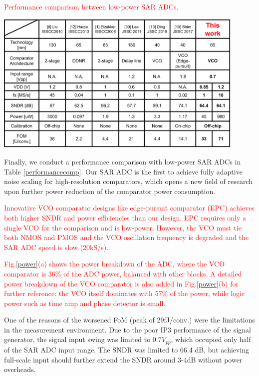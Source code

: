 \documentclass[journal]{IEEEtran}
\begin{document}
\begin{table}[!]
\centering
 \caption{\textcolor{red}{Performance comparison between low-power SAR ADCs.}}
 \includegraphics[width=0.9\textwidth]{figs/table.png}
  \label{performancecomp}
\end{table}

Finally, we conduct a performance comparison with low-power SAR ADCs in Table \ref{performancecomp}. Our SAR ADC is the first to achieve fully adaptive noise scaling for high-resolution comparators, which opens a new field of research upon further power reduction of the comparator power consumption. 

\textcolor{red}{Innovative VCO comparator designs like edge-pursuit comparator (EPC) \cite{shim2017edge} achieves both higher SNDR and power efficiencies than our design. EPC requires only a single VCO for the comparison and is low-power. However, the VCO must tie both NMOS and PMOS and the VCO oscillation frequency is degraded and the SAR ADC speed is slow (20kS/s).}

\textcolor{red}{Fig.\ref{power}(a) shows the power breakdown of the ADC, where the VCO comparator is 36\% of the ADC power, balanced with other blocks. A detailed power breakdown of the VCO comparator is also added in Fig.\ref{power}(b) for further reference: the VCO itself dominates with 57\% of the power, while logic power such as time amp and phase detector is small.}

One of the reasons of the worsened FoM (peak of 29fJ/conv.) were the limitations in the measurement environment. Due to the poor IP3 performance of the signal generator, the signal input swing was limited to $0.7V_{pp}$, which occupied only half of the SAR ADC input range. The SNDR was limited to 66.4 dB, but achieving full-scale input should further extend the SNDR around 3-4dB without power overheads. 
\end{document}
